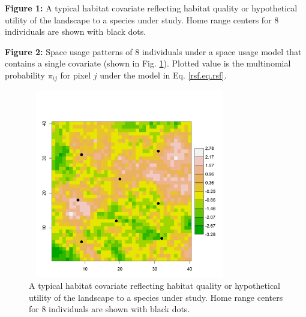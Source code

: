 \documentclass[12pt]{article}
\begin{document}
\vspace{.2in}


{\flushleft \bf
Figure 1:}
A typical habitat covariate reflecting habitat quality or
  hypothetical utility of the landscape to a species under study. Home range centers for 8 individuals are
shown with black dots.

\vspace{.2in}

{\flushleft \bf Figure 2:}
Space usage patterns of 8 individuals under a space usage
  model that contains a single covariate (shown in
  Fig. \ref{rsf.fig.habitat}). Plotted value is the multinomial
  probability $\pi_{ij}$ for pixel $j$ under the model in Eq. \ref{rsf.eq.rsf}.


\newpage


\begin{figure}
\centering
\includegraphics[width=3.5in,height=3.25in]{figs/habitat.png}
\caption{A typical habitat covariate reflecting habitat quality or
  hypothetical utility of the landscape to a species under study. Home range centers for 8 individuals are
shown with black dots.}
\label{rsf.fig.habitat}
\end{figure}
\end{document}
